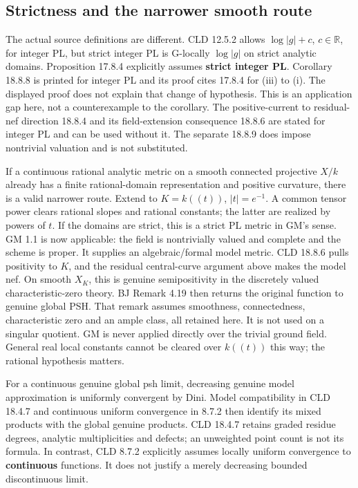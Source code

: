 \documentclass[
  11pt,
]{article}
\begin{document}
\subsection{Strictness and the narrower smooth
route}\label{strictness-and-the-narrower-smooth-route}

The actual source definitions are different. CLD 12.5.2 allows
\(\log|g|+c\), \(c\in\mathbb R\), for integer PL, but strict integer PL
is G-locally \(\log|g|\) on strict analytic domains. Proposition 17.8.4
explicitly assumes \textbf{strict integer PL}. Corollary 18.8.8 is
printed for integer PL and its proof cites 17.8.4 for (iii) to (i). The
displayed proof does not explain that change of hypothesis. This is an
application gap here, not a counterexample to the corollary. The
positive-current to residual-nef direction 18.8.4 and its
field-extension consequence 18.8.6 are stated for integer PL and can be
used without it. The separate 18.8.9 does impose nontrivial valuation
and is not substituted.

If a continuous rational analytic metric on a smooth connected
projective \(X/k\) already has a finite rational-domain representation
and positive curvature, there is a valid narrower route. Extend to
\(K=k((t))\), \(|t|=e^{-1}\). A common tensor power clears rational
slopes and rational constants; the latter are realized by powers of
\(t\). If the domains are strict, this is a strict PL metric in GM's
sense. GM 1.1 is now applicable: the field is nontrivially valued and
complete and the scheme is proper. It supplies an algebraic/formal model
metric. CLD 18.8.6 pulls positivity to \(K\), and the residual
central-curve argument above makes the model nef. On smooth \(X_K\),
this is genuine semipositivity in the discretely valued
characteristic-zero theory. BJ Remark 4.19 then returns the original
function to genuine global PSH. That remark assumes smoothness,
connectedness, characteristic zero and an ample class, all retained
here. It is not used on a singular quotient. GM is never applied
directly over the trivial ground field. General real local constants
cannot be cleared over \(k((t))\) this way; the rational hypothesis
matters.

For a continuous genuine global psh limit, decreasing genuine model
approximation is uniformly convergent by Dini. Model compatibility in
CLD 18.4.7 and continuous uniform convergence in 8.7.2 then identify its
mixed products with the global genuine products. CLD 18.4.7 retains
graded residue degrees, analytic multiplicities and defects; an
unweighted point count is not its formula. In contrast, CLD 8.7.2
explicitly assumes locally uniform convergence to \textbf{continuous}
functions. It does not justify a merely decreasing bounded discontinuous
limit.
\end{document}
